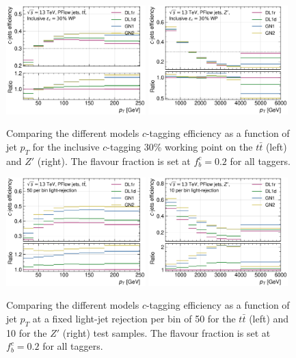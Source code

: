 \begin{figure}[h!]
  \centering
  \includegraphics[width=0.48\textwidth]{Images/FTAG/GN/GN2/pt_plots/pt_ttbar_c_eff.png}
  \includegraphics[width=0.48\textwidth]{Images/FTAG/GN/GN2/pt_plots/pt_zp_c_eff.png}
  \caption{Comparing the different models $c$-tagging efficiency as a function of jet $p_T$ for the inclusive $c$-tagging 30\% working point on the $t\bar{t}$ (left) and $Z'$ (right). The flavour fraction is set at $f^c_b = 0.2$ for all taggers.}
  \label{apfig:GNxptc_eff}
\end{figure} 
\begin{figure}[h!]
  \centering
  \includegraphics[width=0.48\textwidth]{Images/FTAG/GN/GN2/pt_plots/pt_ttbar_c_eff_fixedlight.png}
  \includegraphics[width=0.48\textwidth]{Images/FTAG/GN/GN2/pt_plots/pt_zp_c_eff_fixedlight.png}
  \caption{Comparing the different models $c$-tagging efficiency as a function of jet $p_T$ at a fixed light-jet rejection per bin of 50 for the $t\bar{t}$ (left) and 10 for the $Z'$ (right) test samples. The flavour fraction is set at $f^c_b = 0.2$ for all taggers.}
  \label{apfig:GNxptc_efffixedl}
\end{figure} 
